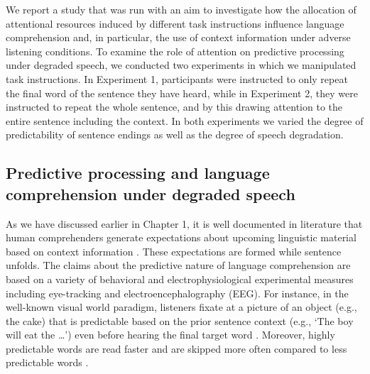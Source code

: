 \documentclass[a4paper, nobind]{templates/ociamthesis}
\begin{document}
We report a study that was run with an aim to investigate how the allocation of attentional resources induced by different task instructions influence language comprehension and, in particular, the use of context information under adverse listening conditions.
To examine the role of attention on predictive processing under degraded speech, we conducted two experiments in which we manipulated task instructions.
In Experiment 1, participants were instructed to only repeat the final word of the sentence they have heard,
while in Experiment 2, they were instructed to repeat the whole sentence, and by this drawing attention to the entire sentence including the context.
In both experiments we varied the degree of predictability of sentence endings as well as the degree of speech degradation.

\hypertarget{predictive-processing-and-language-comprehension-under-degraded-speech}{%
\subsection{Predictive processing and language comprehension under degraded speech}\label{predictive-processing-and-language-comprehension-under-degraded-speech}}

As we have discussed earlier in Chapter 1, it is well documented in literature that human comprehenders generate expectations about upcoming linguistic material based on context information \autocites[for reviews, see][]{Kuperberg2016,Nieuwland2019,Pickering2018,Staub2015}.
These expectations are formed while sentence unfolds.
The claims about the predictive nature of language comprehension are based on a variety of behavioral and electrophysiological experimental measures including eye-tracking and electroencephalography (EEG).
For instance, in the well-known visual world paradigm, listeners fixate at a picture of an object (e.g., the cake) that is predictable based on the prior sentence context (e.g., `The boy will eat the \ldots{}') even before hearing the final target word \autocites[e.g.,][]{Altmann1999,Altmann2007,Ankener2018}.
Moreover, highly predictable words are read faster and are skipped more often compared to less predictable words \autocite{Frisson2005,Rayner2011}.
\end{document}
